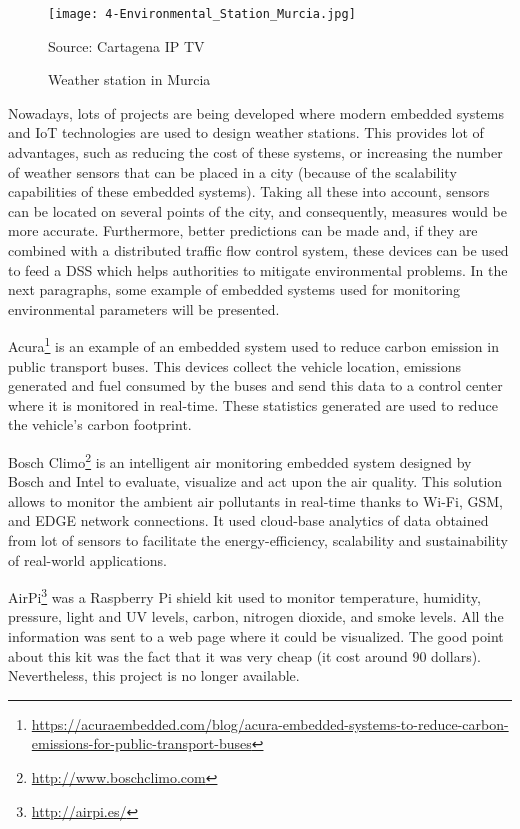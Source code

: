 \begin{figure}[!h]
	\begin{center}
		\texttt{[image: 4-Environmental\_Station\_Murcia.jpg]}
		\caption{Weather station in Murcia}
		\label{fig:4-Environmental_Station_Murcia}{Source: Cartagena IP TV}
	\end{center}
\end{figure}

Nowadays, lots of projects are being developed where modern embedded systems and IoT technologies are used to design weather stations. This provides lot of advantages, such as reducing the cost of these systems, or increasing the number of weather sensors that can be placed in a city (because of the scalability capabilities of these embedded systems). Taking all these into account, sensors can be located on several points of the city, and consequently, measures would be more accurate. Furthermore, better predictions can be made and, if they are combined with a distributed traffic flow control system, these devices can be used to feed a \ac{DSS} which helps authorities to mitigate environmental problems. In the next paragraphs, some example of embedded systems used for monitoring environmental parameters will be presented.

Acura\footnote{\url{https://acuraembedded.com/blog/acura-embedded-systems-to-reduce-carbon-emissions-for-public-transport-buses}} is an example of an embedded system used to reduce carbon emission in public transport buses. This devices collect the vehicle location, emissions generated and fuel consumed by the buses and send this data to a control center where it is monitored in real-time. These statistics generated are used to reduce the vehicle's carbon footprint.

Bosch Climo\footnote{\url{http://www.boschclimo.com}} is an intelligent air monitoring embedded system designed by Bosch and Intel to evaluate, visualize and act upon the air quality. This solution allows to monitor the ambient air pollutants in real-time thanks to Wi-Fi, GSM, and EDGE network connections. It used cloud-base analytics of data obtained from lot of sensors to facilitate the energy-efficiency, scalability and sustainability of real-world applications.


AirPi\footnote{\url{http://airpi.es/}} was a Raspberry Pi shield kit used to monitor temperature, humidity, pressure, light and UV levels, carbon, nitrogen dioxide, and smoke levels. All the information was sent to a web page where it could be visualized. The good point about this kit was the fact that it was very cheap (it cost around 90 dollars).  Nevertheless, this project is no longer available.



